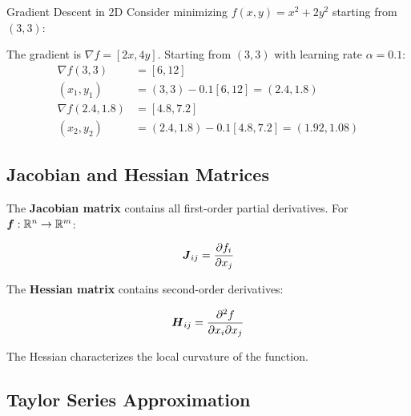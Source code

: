 \begin{examplebox}{Gradient Descent in 2D}
Consider minimizing $f(x, y) = x^2 + 2y^2$ starting from $(3, 3)$:

\begin{center}
\end{center}

The gradient is $\nabla f = [2x, 4y]$. Starting from $(3, 3)$ with learning rate $\alpha = 0.1$:
\begin{align}
\nabla f(3, 3) &= [6, 12] \\
(x_1, y_1) &= (3, 3) - 0.1[6, 12] = (2.4, 1.8) \\
\nabla f(2.4, 1.8) &= [4.8, 7.2] \\
(x_2, y_2) &= (2.4, 1.8) - 0.1[4.8, 7.2] = (1.92, 1.08)
\end{align}
\end{examplebox}

\subsection{Jacobian and Hessian Matrices}

The \textbf{Jacobian matrix} contains all first-order partial derivatives. For $\boldsymbol{f}: \mathbb{R}^n \to \mathbb{R}^m$:

\begin{equation}
\boldsymbol{J}_{ij} = \frac{\partial f_i}{\partial x_j}
\end{equation}

The \textbf{Hessian matrix} contains second-order derivatives:

\begin{equation}
\boldsymbol{H}_{ij} = \frac{\partial^2 f}{\partial x_i \partial x_j}
\end{equation}

The Hessian characterizes the local curvature of the function.

\subsection{Taylor Series Approximation}

